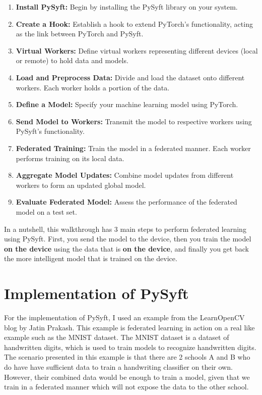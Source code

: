\documentclass[conference]{IEEEtran}
\begin{document}
\begin{enumerate}
    \item \textbf{Install PySyft:} Begin by installing the PySyft library on your system.
    \item \textbf{Create a Hook:} Establish a hook to extend PyTorch's functionality, acting as the link between PyTorch and PySyft.
    \item \textbf{Virtual Workers:} Define virtual workers representing different devices (local or remote) to hold data and models.
    \item \textbf{Load and Preprocess Data:} Divide and load the dataset onto different workers. Each worker holds a portion of the data.
    \item \textbf{Define a Model:} Specify your machine learning model using PyTorch.
    \item \textbf{Send Model to Workers:} Transmit the model to respective workers using PySyft's functionality.
    \item \textbf{Federated Training:} Train the model in a federated manner. Each worker performs training on its local data.
    \item \textbf{Aggregate Model Updates:} Combine model updates from different workers to form an updated global model.
    \item \textbf{Evaluate Federated Model:} Assess the performance of the federated model on a test set.
\end{enumerate}

In a nutshell, this walkthrough has 3 main steps to perform federated learning
using PySyft. First, you send the model to the device, then you train the model
\textbf{on the device} using the data that is \textbf{on the device}, and 
finally you get back the more intelligent model that is trained on the device.

\section{Implementation of PySyft}

For the implementation of PySyft, I used an example from the LearnOpenCV blog
by Jatin Prakash\cite{b4}. This example is federated learning in action on a
real like example such as the MNIST dataset. The MNIST dataset is a dataset of
handwritten digits, which is used to train models to recognize handwritten
digits. The scenario presented in this example is that there are 2 schools A and
B who do have have sufficient data to train a handwriting classifier on their
own. However, their combined data would be enough to train a model, given that
we train in a federated manner which will not expose the data to the other
school.
\end{document}
